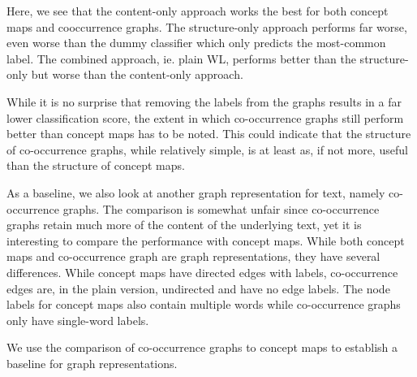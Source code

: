 Here, we see that the content-only approach works the best for both concept maps and cooccurrence graphs.
The structure-only approach performs far worse, even worse than the dummy classifier which only predicts the most-common label.
The combined approach, ie. plain WL, performs better than the structure-only but worse than the content-only approach.

While it is no surprise that removing the labels from the graphs results in a far lower classification score, the extent in which co-occurrence graphs still perform better than concept maps has to be noted.
This could indicate that the structure of co-occurrence graphs, while relatively simple, is at least as, if not more, useful than the structure of concept maps.


As a baseline, we also look at another graph representation for text, namely co-occurrence graphs.
The comparison is somewhat unfair since co-occurrence graphs retain much more of the content of the underlying text, yet it is interesting to compare the performance with concept maps.
While both concept maps and co-occurrence graph are graph representations, they have several differences. While concept maps have directed edges with labels, co-occurrence edges are, in the plain version, undirected and have no edge labels.
The node labels for concept maps also contain multiple words while co-occurrence graphs only have single-word labels.

We use the comparison of co-occurrence graphs to concept maps to establish a baseline for graph representations.


